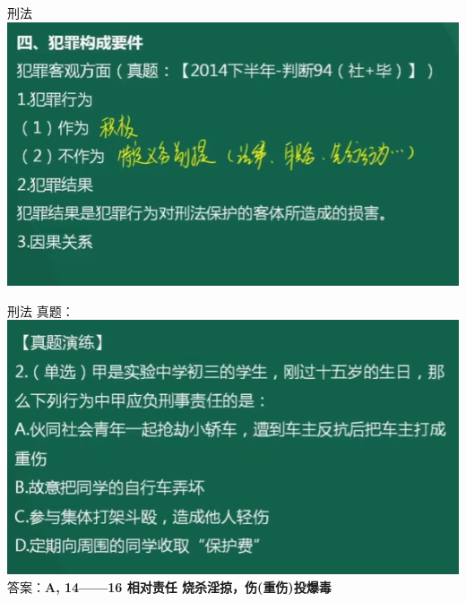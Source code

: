 \documentclass[aspectratio=169]{beamer}
\begin{document}
\begin{frame}[t]{刑法}
    \includegraphics[scale=0.4]{criminal_action_result}\\ 
\end{frame}



\begin{frame}[t]{刑法}
    真题：\\
    \includegraphics[scale=0.4]{criminal_law_005}\\ 
    答案：\textbf{A, 14——16 相对责任  烧杀淫掠，伤(重伤)投爆毒}\\
\end{frame}
\end{document}
